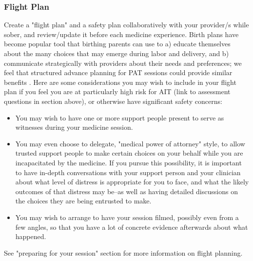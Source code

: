 \documentclass[12pt,letterpaper]{book}
\begin{document}
\subsubsection*{Flight Plan}
Create a "flight plan" and a safety plan collaboratively with your provider/s while sober, and review/update it before each medicine experience. Birth plans have become popular tool that birthing parents can use to a) educate themselves about the many choices that may emerge during labor and delivery, and b) communicate strategically with providers about their needs and preferences; we feel that structured advance planning for PAT sessions could provide similar benefits \cite{birthPlan}. Here are some considerations you may wish to include in your flight plan if you feel you are at particularly high risk for AIT (link to assessment questions in section above), or otherwise have significant safety concerns:
\begin{itemize}
    \item You may wish to have one or more support people present to serve as witnesses during your medicine session. 
    \item You may even choose to delegate, "medical power of attorney" style, to allow trusted support people to make certain choices on your behalf while you are incapacitated by the medicine. If you pursue this possibility, it is important to have in-depth conversations with your support person and your clinician about what level of distress is appropriate for you to face, and what the likely outcomes of that distress may be–as well as having detailed discussions on the choices they are being entrusted to make. 
    \item You may wish to arrange to have your session filmed, possibly even from a few angles, so that you have a lot of concrete evidence afterwards about what happened.
\end{itemize}
See "preparing for your session" section for more information on flight planning. 
\end{document}
